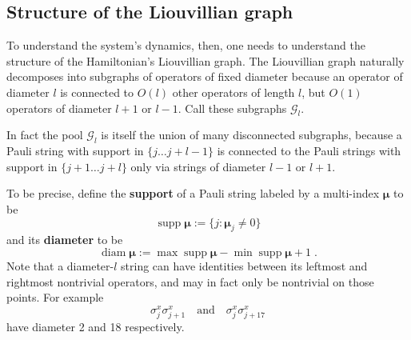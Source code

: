 \documentclass[aps,prb,nofootinbib,twocolumn,balancelastpage,amsmath,amssymb,floatfix,superscriptaddress,]{revtex4-1}
\DeclareMathOperator{\supp}{supp}
\DeclareMathOperator{\diam}{diam}
\newcommand{\pool}{\mathcal G}
\begin{document}
\subsection{Structure of the Liouvillian graph} \label{ss:graph-structure}


To understand the system's dynamics, then, one needs to understand the structure of the Hamiltonian's Liouvillian graph.
The Liouvillian graph naturally decomposes into subgraphs of operators of fixed diameter
because an operator of diameter $l$ is connected to $O(l)$ other operators of length $l$, but $O(1)$ operators of diameter $l+1$ or $l-1$.
Call these subgraphs $\pool_l$.

In fact the pool $\pool_l$ is itself the union of many disconnected subgraphs,
because a Pauli string with support in $\{j \dots j+l-1\}$
is connected to the Pauli strings with support in $\{j+1 \dots j+l\}$
only via strings of diameter $l-1$ or $l+1$.

To be precise, define the \textbf{support} of a Pauli string labeled by a multi-index $\bm \mu $ to be
\begin{equation}
  \supp \bm \mu  := \{j : \bm \mu _j \ne 0\}
\end{equation}
and its \textbf{diameter} to be
\begin{equation}
  \diam \bm \mu  := \max \supp \bm \mu  - \min \supp \bm \mu  + 1\;.
\end{equation}
Note that a diameter-$l$ string can have identities between its leftmost and rightmost nontrivial operators,
and may in fact only be nontrivial on those points. For example
\begin{equation}
  \label{eq:diam-id-ex}
  \sigma ^x_j\sigma ^x_{j+1}\quad\text{and}\quad \sigma ^x_j\sigma ^x_{j+17}
\end{equation}
have diameter 2 and 18 respectively.
\end{document}
